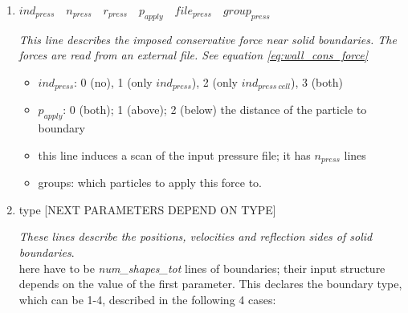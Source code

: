 \documentclass[a4paper,10pt]{scrreprt}
\begin{document}
\begin{enumerate}
\item $  ind_{press} \quad n_{press} \quad r_{press} \quad p_{apply} \quad file_{press} \quad group_{press} $

	{\em This line describes the imposed conservative force near solid boundaries. The forces are read from an external file. See equation \eqref{eq:wall_cons_force}}
	\begin{itemize}
	\item $ ind_{press}$: 0 (no), 1 (only $ ind_{press}$), 2 (only $ ind_{press\ cell}$), 3 (both)
	\item $ p_{apply}$: 0 (both); 1 (above); 2 (below) the distance of the particle to boundary
	\item this line induces a scan of the input pressure file; it has $ n_{press}$ lines
	\item groups: which particles to apply this force to.
	\end{itemize}

\item {type} [NEXT PARAMETERS DEPEND ON TYPE]

	{\em These lines describe the positions, velocities and reflection sides of solid boundaries}.\\
here have to be \textit{num\_shapes\_tot} lines of boundaries; their input structure depends on the value of the first parameter. This declares the boundary type, which can be 1-4, described in the following 4 cases:


\end{enumerate}
\end{document}
